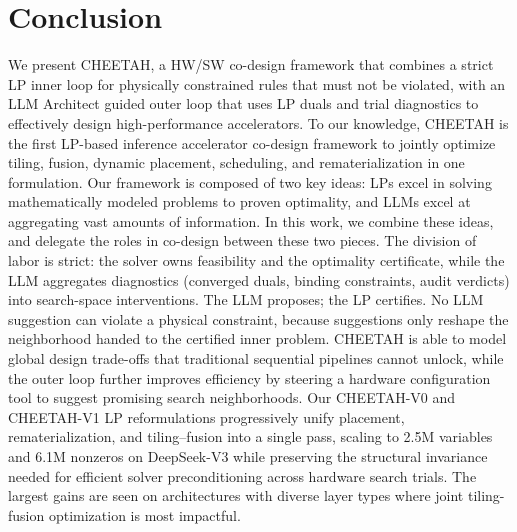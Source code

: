 

\section{Conclusion}
\label{sec:conclusion}

We present CHEETAH, a HW/SW co-design framework that combines a strict LP inner loop for physically constrained rules that must not be violated, with an LLM Architect guided outer loop that uses LP duals and trial diagnostics to effectively design high-performance accelerators.
To our knowledge, CHEETAH is the first LP-based inference accelerator co-design framework to jointly optimize tiling, fusion, dynamic placement, scheduling, and rematerialization in one formulation. 
Our framework is composed of two key ideas: LPs excel in solving mathematically modeled problems to proven optimality, and LLMs excel at aggregating vast amounts of information. In this work, we combine these ideas, and delegate the roles in co-design between these two pieces. The division of labor is strict: the solver owns feasibility and the optimality certificate, while the LLM aggregates diagnostics (converged duals, binding constraints, audit verdicts) into search-space interventions. The LLM proposes; the LP certifies. No LLM suggestion can violate a physical constraint, because suggestions only reshape the neighborhood handed to the certified inner problem.
CHEETAH is able to model global design trade-offs that traditional sequential pipelines cannot unlock, while the outer loop further improves efficiency by steering a hardware configuration tool to suggest promising search neighborhoods. 
Our CHEETAH-V0 and CHEETAH-V1 LP reformulations progressively unify placement, rematerialization, and tiling--fusion into a single pass, scaling to 2.5M variables and 6.1M nonzeros on DeepSeek-V3 while preserving the structural invariance needed for efficient solver preconditioning across hardware search trials. The largest gains are seen on architectures with diverse layer types where joint tiling-fusion optimization is most impactful.

